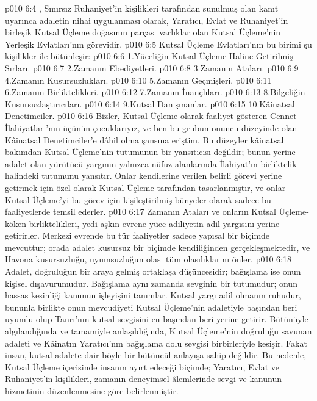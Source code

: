 \vs p010 6:4 , Sınırsız Ruhaniyet’in kişilikleri tarafından sunulmuş olan kanıt uyarınca adaletin nihai uygulanması olarak, Yaratıcı, Evlat ve Ruhaniyet’in birleşik Kutsal Üçleme doğasının parçası varlıklar olan Kutsal Üçleme’nin Yerleşik Evlatları’nın görevidir.
\vs p010 6:5 Kutsal Üçleme Evlatları’nın bu birimi şu kişilikler ile bütünleşir:
\vs p010 6:6 1.\bibnobreakspace Yüceliğin Kutsal Üçleme Haline Getirilmiş Sırları.
\vs p010 6:7 2.\bibnobreakspace Zamanın Ebediyetleri.
\vs p010 6:8 3.\bibnobreakspace Zamanın Ataları.
\vs p010 6:9 4.\bibnobreakspace Zamanın Kusursuzlukları.
\vs p010 6:10 5.\bibnobreakspace Zamanın Geçmişleri.
\vs p010 6:11 6.\bibnobreakspace Zamanın Birliktelikleri.
\vs p010 6:12 7.\bibnobreakspace Zamanın İnançlıları.
\vs p010 6:13 8.\bibnobreakspace Bilgeliğin Kusursuzlaştırıcıları.
\vs p010 6:14 9.\bibnobreakspace Kutsal Danışmanlar.
\vs p010 6:15 10.\bibnobreakspace Kâinatsal Denetimciler.
\vs p010 6:16 Bizler, Kutsal Üçleme olarak faaliyet gösteren Cennet İlahiyatları’nın üçünün çocuklarıyız, ve ben bu grubun onuncu düzeyinde olan Kâinatsal Denetimciler’e dâhil olma şansına eriştim. Bu düzeyler kâinatsal bakımdan Kutsal Üçleme’nin tutumunun bir yansıtıcısı değildir; bunun yerine adalet olan yürütücü yargının yalnızca nüfuz alanlarında İlahiyat’ın birliktelik halindeki tutumunu yansıtır. Onlar kendilerine verilen belirli görevi yerine getirmek için özel olarak Kutsal Üçleme tarafından tasarlanmıştır, ve onlar Kutsal Üçleme’yi bu görev için kişileştirilmiş bünyeler olarak sadece bu faaliyetlerde temsil ederler.
\vs p010 6:17 Zamanın Ataları ve onların Kutsal Üçleme\hyp{}köken birliktelikleri, yedi aşkın\hyp{}evrene yüce adiliyetin adil yargısını yerine getirirler. Merkezi evrende bu tür faaliyetler sadece yapısal bir biçimde mevcuttur; orada adalet kusursuz bir biçimde kendiliğinden gerçekleşmektedir, ve Havona kusursuzluğu, uyumsuzluğun olası tüm olasılıklarını önler.
\vs p010 6:18 Adalet, doğruluğun bir araya gelmiş ortaklaşa düşüncesidir; bağışlama ise onun kişisel dışavurumudur. Bağışlama aynı zamanda sevginin bir tutumudur; onun hassas kesinliği kanunun işleyişini tanımlar. Kutsal yargı adil olmanın ruhudur, bununla birlikte onun mevcudiyeti Kutsal Üçleme’nin adaletiyle başından beri uyumlu olup Tanrı’nın kutsal sevgisini en başından beri yerine getirir. Bütünüyle algılandığında ve tamamiyle anlaşıldığında, Kutsal Üçleme’nin doğruluğu savunan adaleti ve Kâinatın Yaratıcı’nın bağışlama dolu sevgisi birbirleriyle kesişir. Fakat insan, kutsal adalete dair böyle bir bütüncül anlayışa sahip değildir. Bu nedenle, Kutsal Üçleme içerisinde insanın ayırt edeceği biçimde; Yaratıcı, Evlat ve Ruhaniyet’in kişilikleri, zamanın deneyimsel âlemlerinde sevgi ve kanunun hizmetinin düzenlenmesine göre belirlenmiştir.
